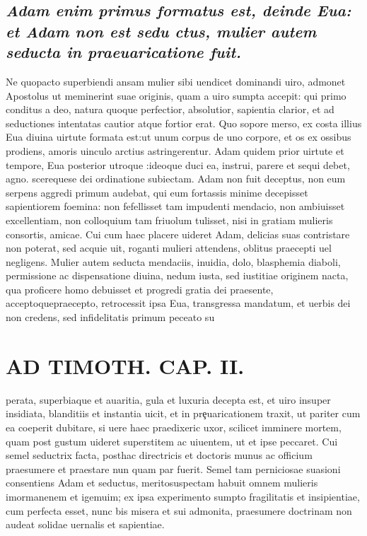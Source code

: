 \documentclass{article}
\begin{document}
\begin{pages}
\subsection*{\textit{Adam enim primus formatus est, deinde Eua: et Adam non est sedu ctus, mulier autem seducta in praeuaricatione fuit. }}\pstart Ne quopacto superbiendi ansam mulier sibi uendicet dominandi uiro, admonet Apostolus ut meminerint suae originis, quam a uiro sumpta accepit: qui primo conditus a deo, natura quoque  perfectior, absolutior, sapientia clarior, et ad seductiones intentatas cautior atque  fortior erat. Quo sopore merso, ex costa illius Eua diuina uirtute formata est:ut unum corpus de uno corpore, et os ex ossibus prodiens, amoris uinculo arctius astringerentur. Adam quidem prior uirtute et tempore, Eua posterior utroque :ideoque  duci ea, instrui, parere et sequi debet, agno. scerequese dei ordinatione subiectam. Adam non fuit deceptus, non eum serpens aggredi primum audebat, qui eum fortassis minime decepisset sapientiorem foemina: non fefellisset tam impudenti mendacio, non ambiuisset excellentiam, non colloquium tam friuolum tulisset, nisi in gratiam mulieris consortis, amicae. Cui cum haec placere uideret Adam, delicias suas contristare non poterat, sed acquie uit, roganti mulieri attendens, oblitus praecepti uel negligens. Mulier autem seducta mendaciis, inuidia, dolo, blasphemia diaboli, permissione ac dispensatione diuina, nedum iusta, sed iustitiae originem nacta, qua proficere homo debuisset et progredi gratia dei praesente, acceptoquepraecepto, retrocessit ipsa Eua, transgressa mandatum, et uerbis dei non credens, sed infidelitatis primum peceato su  \pend
\section*{AD TIMOTH. CAP. II. }
\marginpar{[ p.489 ]}\pstart perata, superbiaque  et auaritia, gula et luxuria decepta est, et uiro insuper insidiata, blanditiis et instantia uicit, et in prȩuaricationem traxit, ut pariter cum ea coeperit dubitare, si uere haec praedixeric uxor, scilicet imminere mortem, quam post gustum uideret superstitem ac uiuentem, ut et ipse peccaret. Cui semel seductrix facta, posthac directricis et doctoris munus ac officium praesumere et praestare nun quam par fuerit. Semel tam perniciosae suasioni consentiens Adam et seductus, meritosuspectam habuit omnem mulieris imormanenem et igemuim; ex ipsa experimento sumpto fragilitatis et insipientiae, cum perfecta esset, nunc bis misera et sui admonita, praesumere doctrinam non audeat solidae uernalis et sapientiae.  \pend
{}
{}

\end{pages}
\end{document}

